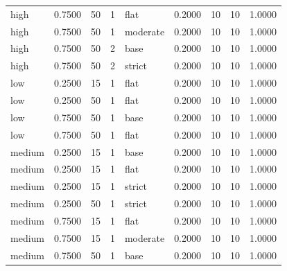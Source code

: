 \begin{tabular}{lrrrlrrrr}
high & 0.7500 & 50 & 1 & flat & 0.2000 & 10 & 10 & 1.0000 \\
high & 0.7500 & 50 & 1 & moderate & 0.2000 & 10 & 10 & 1.0000 \\
high & 0.7500 & 50 & 2 & base & 0.2000 & 10 & 10 & 1.0000 \\
high & 0.7500 & 50 & 2 & strict & 0.2000 & 10 & 10 & 1.0000 \\
low & 0.2500 & 15 & 1 & flat & 0.2000 & 10 & 10 & 1.0000 \\
low & 0.2500 & 50 & 1 & flat & 0.2000 & 10 & 10 & 1.0000 \\
low & 0.7500 & 50 & 1 & base & 0.2000 & 10 & 10 & 1.0000 \\
low & 0.7500 & 50 & 1 & flat & 0.2000 & 10 & 10 & 1.0000 \\
medium & 0.2500 & 15 & 1 & base & 0.2000 & 10 & 10 & 1.0000 \\
medium & 0.2500 & 15 & 1 & flat & 0.2000 & 10 & 10 & 1.0000 \\
medium & 0.2500 & 15 & 1 & strict & 0.2000 & 10 & 10 & 1.0000 \\
medium & 0.2500 & 50 & 1 & strict & 0.2000 & 10 & 10 & 1.0000 \\
medium & 0.7500 & 15 & 1 & flat & 0.2000 & 10 & 10 & 1.0000 \\
medium & 0.7500 & 15 & 1 & moderate & 0.2000 & 10 & 10 & 1.0000 \\
medium & 0.7500 & 50 & 1 & base & 0.2000 & 10 & 10 & 1.0000 \\
\bottomrule
\end{tabular}
